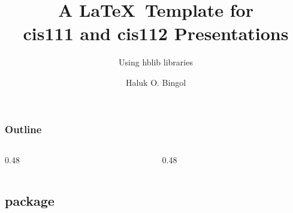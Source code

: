 \documentclass[aspectratio=169,10pt,compress]{beamer}
\title{
	A \LaTeX\ Template for\\
	cis111 and cis112 Presentations
}
\subtitle{
	Using hblib libraries
}
\author[Bingol]{Haluk O. Bingol}
\institute[FCIS]{
    Faculty of Computer and Information Sciences\\
    Yeditepe University
}
\date{
	{\tiny \hbTimeStamp}
}
\begin{document}
\begin{frame}[t,fragile]
  \titlepage
\end{frame}




\begin{frame}[t,fragile] \frametitle{Outline}
  \begin{columns}[T]
    \begin{column}{0.48\textwidth}
      \tableofcontents[sections={1-7}, hideallsubsections]
    \end{column}
    \begin{column}{0.48\textwidth}
      \tableofcontents[sections={8-14}, hideallsubsections]
    \end{column}
  \end{columns}
\end{frame}








\subsection[hStuff]{}




\subsection[menukeys]{ package}
\end{document}
